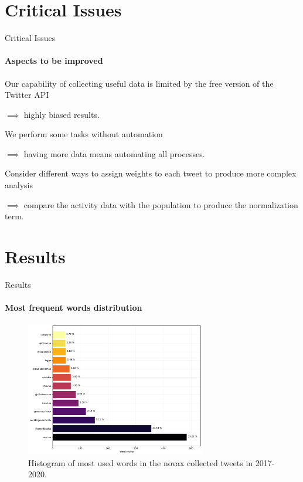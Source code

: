 \documentclass[9pt]{beamer}
\begin{document}
	\section{Critical Issues}
	
	\begin{frame}[c]{Critical Issues}
	\framesubtitle{Aspects to be improved}


	\medskip
	Our capability of collecting useful data is \alert{limited} by the \alert{free version of the Twitter API}
	
	\medskip
	$\implies$ highly biased results.
	
	\medskip
	\medskip
	\pause
	
	\medskip
	We perform some tasks without automation
	
	\medskip
	
	$\implies$ having \alert{more data means automating all processes}.
	
	\medskip
	\medskip
	\pause
	
	\medskip
	Consider different ways to assign weights to each tweet to produce more complex analysis
	
	\medskip
	
	$\implies$ compare the activity data with the population to produce the normalization term.
	
	\end{frame}
	
	\section{Results}
	\begin{frame}{Results}
	    \framesubtitle{Most frequent words distribution}
	    \begin{figure}[t]
	    \begin{minipage}[l]{1\columnwidth}
	    \centering
	    \includegraphics[width=0.7\textwidth]{images/word_2017-2020.pdf}
	    \caption{Histogram of most used words in the novax collected tweets in 2017-2020.}
   \label{fig:count_word}
   \end{minipage}
\end{figure}
	
	\end{frame}
	
\end{document}
